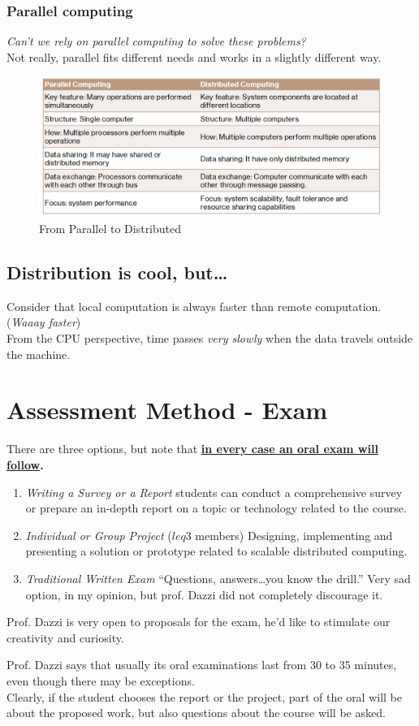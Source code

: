 \subsubsection{Parallel computing}
\textit{Can't we rely on parallel computing to solve these problems?}\\
Not really, parallel fits different needs and works in a slightly different way.
\begin{figure}[htbp]
   \centering
   \includegraphics{images/01/parallel.png}
   \caption{From Parallel to Distributed}
   \label{fig:01/parallel}
\end{figure}

\subsection{Distribution is cool, but\dots}

Consider that local computation is always faster than remote computation. (\textit{Waaay faster})\\
From the CPU perspective, time passes \textit{very slowly} when the data travels outside the machine.

\section{Assessment Method - Exam}
There are three options, but note that
\textbf{\ul{in every case an oral exam will follow}.}
\begin{enumerate}
   \item \textit{Writing a Survey or a Report}
   students can conduct a comprehensive survey or prepare an in-depth report on a topic or technology related to the course.
   \item \textit{Individual or Group Project} ($leq 3$ members)
   Designing, implementing and presenting a solution or prototype related to scalable distributed computing.
   \item \textit{Traditional Written Exam}
   ``Questions, answers\dots you know the drill.''
   Very sad option, in my opinion, but prof. Dazzi did not completely discourage it.
\end{enumerate}
Prof. Dazzi is very open to proposals for the exam, he'd like to stimulate our creativity and curiosity.

Prof. Dazzi says that usually its oral examinations last from 30 to 35 minutes, even though there may be exceptions.\\
Clearly, if the student chooses the report or the project, part of the oral will be about the proposed work, but also questions about the course will be asked.
